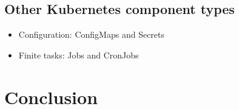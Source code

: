 \documentclass{beamer}
\begin{document}
	\subsection{Other Kubernetes component types}
	\begin{frame}
		\begin{itemize}
			\item Configuration: ConfigMaps and Secrets
			\pause
			\item Finite tasks: Jobs and CronJobs
		\end{itemize}
	\end{frame}
	\section{Conclusion}
	\begin{frame}[plain]
		\titlepage
	\end{frame}
\end{document}

